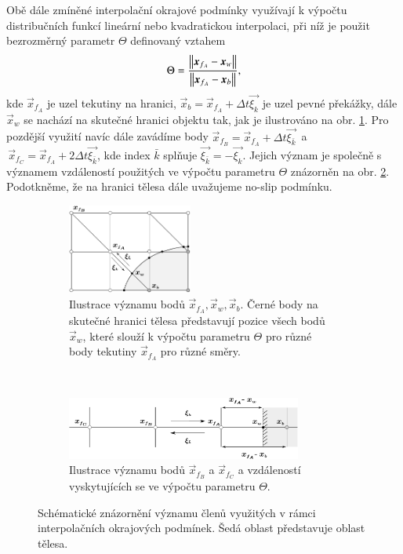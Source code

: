 Obě dále zmíněné interpolační okrajové podmínky využívají k výpočtu distribučních funkcí lineární nebo kvadratickou interpolaci, při níž je použit bezrozměrný parametr $ \Theta $ definovaný vztahem
\begin{equation}\label{eq:q}
\Theta = \frac{\left\lVert\boldsymbol{x}_{f{_A}}-\boldsymbol{x}_w\right\rVert}{\left\lVert\boldsymbol{x}_{f{_A}}-\boldsymbol{x}_b\right\rVert},
\end{equation}
kde $ \vec{x}_{f{_A}} $ je uzel tekutiny na hranici, $ \vec{x}_b =  \vec{x}_{f{_A}} + \Delta t \vec{\xi_{k}}$ je uzel pevné překážky, dále $ \vec{x}_w$ se nachází na skutečné hranici objektu tak, jak je ilustrováno na obr. \ref{fig:bouz}. Pro pozdější využití navíc dále zavádíme body \mbox{$ \vec{x}_{f{_B}} = \vec{x}_{f{_A}} + \Delta t \vec{\xi_{\bar{k}}} \,$} a $\,  \vec{x}_{f{_C}} = \vec{x}_{f{_A}} + 2\Delta t \vec{\xi_{\bar{k}}}  $, kde index $ \bar{k} $ splňuje $ \vec{\xi_{\bar{k}}} = -\vec{\xi_{k}}$. Jejich význam je společně s významem vzdáleností použitých ve výpočtu parametru $ \Theta $ znázorněn na obr. \ref{fig:bouz2}. Podotkněme, že na hranici tělesa dále uvažujeme no-slip podmínku.
\begin{figure}[H]
	\centering
	\begin{subfigure}{0.95\textwidth}
		\centering
		\includegraphics[width=0.45\textwidth]{Images/bouzidi.pdf}
		\caption{Ilustrace významu bodů $ \vec{x}_{f{_A}}, \vec{x}_w, \vec{x}_b$. Černé body na skutečné hranici tělesa představují pozice všech bodů $ \vec{x}_w$, které slouží k výpočtu parametru $ \Theta $ pro různé body tekutiny $ \vec{x}_{f{_A}} $ pro různé směry.}
		\label{fig:bouz}
	\end{subfigure}%
	\\[10pt]
	\begin{subfigure}{0.95\textwidth}
		\centering
		\includegraphics[width=0.85\textwidth]{Images/bouzidi2.pdf}
		\caption{Ilustrace významu bodů $ \vec{x}_{f{_B}} $ a $ \vec{x}_{f{_C}} $ a vzdáleností vyskytujících se ve výpočtu parametru $ \Theta $.}
		\label{fig:bouz2}
	\end{subfigure}
	\vspace{3mm}
	\caption{Schématické znázornění významu členů využitých v rámci interpolačních okrajových podmínek. Šedá oblast představuje oblast tělesa.}
	\label{fig:lattice}
\end{figure}

